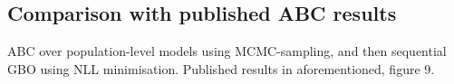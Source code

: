 \documentclass[mphil,deptreport,ianc]{infthesis} %
\begin{document}

\subsection{Comparison with published ABC results}

\cite{Rene2020} ABC over population-level models using MCMC-sampling, and then sequential GBO using NLL minimisation.
Published results in aforementioned, figure 9.
\end{document}
